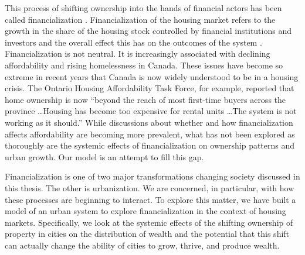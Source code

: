 


This process of shifting ownership into the hands of financial actors has been called financialization \cite{farhaReportFinancializationHousing2017, hansenFinanceCapitalismFinancialization2014, tomaskovic-deveyFinancializationCausesInequality2013, palleyFinancializationWhatIt2007, seccarecciaUnderstandingFinancializationHistory2013, nemtinFinancializationHousingSocial2021}.  
Financialization of the housing market refers to the growth in the share of the housing stock controlled by financial institutions and investors and the overall effect this has on the outcomes of the system \cite{farhaReportFinancializationHousing2017, hansenFinanceCapitalismFinancialization2014}. %
Financialization is not neutral. It is increasingly associated with declining affordability and rising homelessness in Canada. These issues have become so extreme in recent years that Canada is now widely understood to be in a housing crisis. The Ontario Housing Affordability Task Force, for example, reported that home ownership is now ``beyond the reach of most first-time buyers across the province \dots Housing has become too expensive for rental units \dots The system is not working as it should.'' While discussions about whether and how financialization affects affordability are becoming more prevalent, what has not been explored as thoroughly are the systemic effects of financialization on ownership patterns and urban growth. Our model is an attempt to fill this gap.%

Financialization is one of two major transformations changing society discussed in this thesis. The other is urbanization. We are concerned, in particular, with how these processes are beginning to interact. To explore this matter, we have built a model of an urban system to explore financialization in the context of housing markets. Specifically, we look at the systemic effects of the shifting ownership of property in cities on the distribution of wealth and the potential that this shift can actually change the ability of cities to grow, thrive, and produce wealth.

